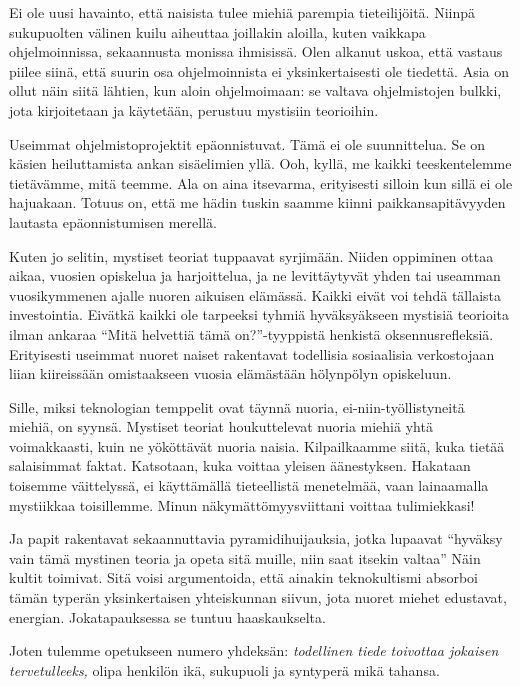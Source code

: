 Ei ole uusi havainto, että naisista tulee miehiä parempia tieteilijöitä. Niinpä sukupuolten välinen kuilu aiheuttaa joillakin aloilla, kuten vaikkapa ohjelmoinnissa, sekaannusta monissa ihmisissä. Olen alkanut uskoa, että vastaus piilee siinä, että suurin osa ohjelmoinnista ei yksinkertaisesti ole tiedettä. Asia on ollut näin siitä lähtien, kun aloin ohjelmoimaan: se valtava ohjelmistojen bulkki, jota kirjoitetaan ja käytetään, perustuu mystisiin teorioihin.

Useimmat ohjelmistoprojektit epäonnistuvat. Tämä ei ole suunnittelua. Se on käsien heiluttamista ankan sisäelimien yllä. Ooh, kyllä, me kaikki teeskentelemme tietävämme, mitä teemme. Ala on aina itsevarma, erityisesti silloin kun sillä ei ole hajuakaan. Totuus on, että me hädin tuskin saamme kiinni paikkansapitävyyden lautasta epäonnistumisen merellä.

Kuten jo selitin, mystiset teoriat tuppaavat syrjimään. Niiden oppiminen ottaa aikaa, vuosien opiskelua ja harjoittelua, ja ne levittäytyvät yhden tai useamman vuosikymmenen ajalle nuoren aikuisen elämässä. Kaikki eivät voi tehdä tällaista investointia. Eivätkä kaikki ole tarpeeksi tyhmiä hyväksyäkseen mystisiä teorioita ilman ankaraa ``Mitä helvettiä tämä on?''-tyyppistä henkistä oksennusrefleksiä. Erityisesti useimmat nuoret naiset rakentavat todellisia sosiaalisia verkostojaan liian kiireissään omistaakseen vuosia elämästään hölynpölyn opiskeluun.

Sille, miksi teknologian temppelit ovat täynnä nuoria, ei-niin-työllistyneitä miehiä, on syynsä. Mystiset teoriat houkuttelevat nuoria miehiä yhtä voimakkaasti, kuin ne yököttävät nuoria naisia. Kilpailkaamme siitä, kuka tietää salaisimmat faktat. Katsotaan, kuka voittaa yleisen äänestyksen. Hakataan toisemme väittelyssä, ei käyttämällä tieteellistä menetelmää, vaan lainaamalla mystiikkaa toisillemme. Minun näkymättömyysviittani voittaa tulimiekkasi!

Ja papit rakentavat sekaannuttavia pyramidihuijauksia, jotka lupaavat ``hyväksy vain tämä mystinen teoria ja opeta sitä muille, niin saat itsekin valtaa'' Näin kultit toimivat. Sitä voisi argumentoida, että ainakin teknokultismi absorboi tämän typerän yksinkertaisen yhteiskunnan siivun, jota nuoret miehet edustavat, energian. Jokatapauksessa se tuntuu haaskaukselta.

Joten tulemme opetukseen numero yhdeksän: \emph{todellinen tiede toivottaa jokaisen tervetulleeks,} olipa henkilön ikä, sukupuoli ja syntyperä mikä tahansa.

